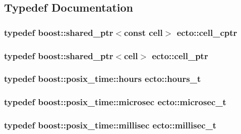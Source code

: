 \subsection{Typedef Documentation}
\hypertarget{namespaceecto_ab708c826226c91fd6f3c8c121f293a78}{
\subsubsection[{cell\-\_\-cptr}]{\setlength{\rightskip}{0pt plus 5cm}typedef boost\-::shared\-\_\-ptr$<$const {\bf cell}$>$ {\bf ecto\-::cell\-\_\-cptr}}}\label{namespaceecto_ab708c826226c91fd6f3c8c121f293a78}
\hypertarget{namespaceecto_aed1809e82b9229ea81ef9ee3438cf62c}{
\subsubsection[{cell\-\_\-ptr}]{\setlength{\rightskip}{0pt plus 5cm}typedef boost\-::shared\-\_\-ptr$<${\bf cell}$>$ {\bf ecto\-::cell\-\_\-ptr}}}\label{namespaceecto_aed1809e82b9229ea81ef9ee3438cf62c}
\hypertarget{namespaceecto_a477c167c1e1288b689db5872f650540e}{
\subsubsection[{hours\-\_\-t}]{\setlength{\rightskip}{0pt plus 5cm}typedef boost\-::posix\-\_\-time\-::hours {\bf ecto\-::hours\-\_\-t}}}\label{namespaceecto_a477c167c1e1288b689db5872f650540e}
\hypertarget{namespaceecto_affe36dc8be6d20a6b8f7359655c8dc23}{
\subsubsection[{microsec\-\_\-t}]{\setlength{\rightskip}{0pt plus 5cm}typedef boost\-::posix\-\_\-time\-::microsec {\bf ecto\-::microsec\-\_\-t}}}\label{namespaceecto_affe36dc8be6d20a6b8f7359655c8dc23}
\hypertarget{namespaceecto_ab1f4721cc3b311f9615b3092d291260b}{
\subsubsection[{millisec\-\_\-t}]{\setlength{\rightskip}{0pt plus 5cm}typedef boost\-::posix\-\_\-time\-::millisec {\bf ecto\-::millisec\-\_\-t}}}\label{namespaceecto_ab1f4721cc3b311f9615b3092d291260b}
